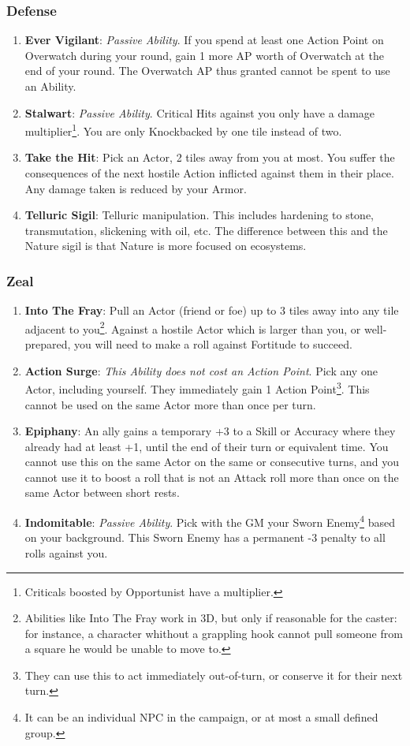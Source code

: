 \subsubsection{Defense}
\begin{enumerate}
    \item \textbf{Ever Vigilant}: \textit{Passive Ability}. If you spend at least one Action Point on Overwatch during your round, gain 1 more AP worth of Overwatch at the end of your round. The Overwatch AP thus granted cannot be spent to use an Ability.
    \item \textbf{Stalwart}: \textit{Passive Ability}. Critical Hits against you only have a  damage multiplier\footnote{Criticals boosted by Opportunist have a  multiplier.}. You are only Knockbacked by one tile instead of two.
    \item \textbf{Take the Hit}: Pick an Actor, 2 tiles away from you at most. You suffer the consequences of the next hostile Action inflicted against them in their place. Any damage taken is reduced by your Armor.
    \item \textbf{Telluric Sigil}: Telluric manipulation. This includes hardening to stone, transmutation, slickening with oil, etc. The difference between this and the Nature sigil is that Nature is more focused on ecosystems.
\end{enumerate}

\subsubsection{Zeal}
\begin{enumerate}
    \item \textbf{Into The Fray}: Pull an Actor (friend or foe) up to 3 tiles away into any tile adjacent to you\footnote{Abilities like Into The Fray work in 3D, but only if reasonable for the caster: for instance, a character whithout a grappling hook cannot pull someone from a square he would be unable to move to.}. Against a hostile Actor which is larger than you, or well-prepared, you will need to make a roll against Fortitude to succeed.
    \item \textbf{Action Surge}: \textit{This Ability does not cost an Action Point}. Pick any one Actor, including yourself. They immediately gain 1 Action Point\footnote{They can use this to act immediately out-of-turn, or conserve it for their next turn.}. This cannot be used on the same Actor more than once per turn.
    \item \textbf{Epiphany}: An ally gains a temporary +3 to a Skill or Accuracy where they already had at least +1, until the end of their turn or equivalent time. You cannot use this on the same Actor on the same or consecutive turns, and you cannot use it to boost a roll that is not an Attack roll more than once on the same Actor between short rests.
    \item \textbf{Indomitable}: \textit{Passive Ability}. Pick with the GM your Sworn Enemy\footnote{It can be an individual NPC in the campaign, or at most a small defined group.} based on your background. This Sworn Enemy has a permanent -3 penalty to all rolls against you.
\end{enumerate}

